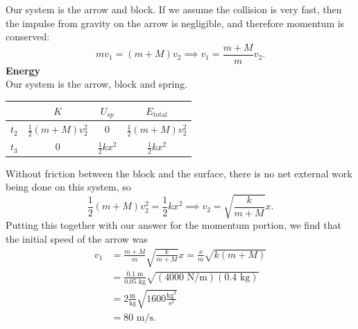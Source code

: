 \documentclass[]{article}
\begin{document}
\begin{TeacherMargin}
\begin{center}
\end{center}
Our system is the arrow and block. If we assume the collision is very fast, then the impulse from gravity on the arrow is negligible, and therefore momentum is conserved:
\[
mv_{1} = (m+M)v_{2} \implies v_{1} = \frac{m+M}{m}v_{2}.
\]
\textbf{Energy} \\
Our system is the arrow, block and spring.
\begin{center}
	\begin{tabular}{c||c|c||c}
		& $K$ & $U_{sp}$ & $E_{\text{total}}$ \\ \hline
		$t_{2}$ & $\frac{1}{2}(m+M)v_{2}^{2}$ & 0 & $\frac{1}{2}(m+M)v_{2}^{2}$ \\ \hline
		$t_{3}$ & 0 & $\frac{1}{2}kx^{2}$& $\frac{1}{2}kx^{2}$
	\end{tabular}
\end{center}
Without friction between the block and the surface, there is no net external work being done on this system, so
\[
\frac{1}{2}(m+M)v_{2}^{2} = \frac{1}{2}kx^{2} \implies v_{2} = \sqrt{\frac{k}{m+M}}x.
\]
Putting this together with our answer for the momentum portion, we find that the initial speed of the arrow was
\begin{align*}
	v_{1} & = \frac{m+M}{m}\sqrt{\frac{k}{m+M}}x = \frac{x}{m}\sqrt{k(m+M)} \\
	& = \frac{0.1\text{ m}}{0.05\text{ kg}}\sqrt{(4000\text{ N/m})(0.4\text{ kg})} \\
	& = 2\frac{\text{m}}{\text{kg}} \sqrt{1600\frac{\text{kg}^{2}}{\text{s}^{2}}} \\
	& = 80\text{ m/s}.
\end{align*}
\end{TeacherMargin}
\end{document}

